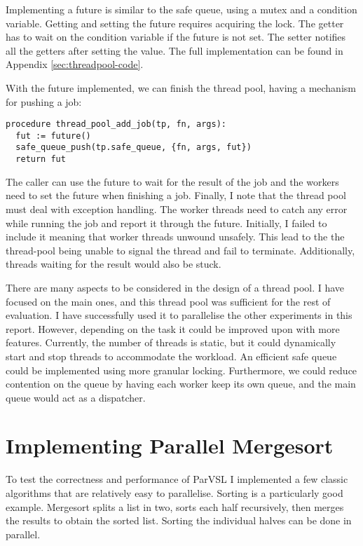 Implementing a future is similar to the safe queue, using a mutex and a condition variable.
Getting and setting the future requires acquiring the lock. The getter has to wait on the condition
variable if the future is not set. The setter notifies all the getters after setting the value.
The full implementation can be found in Appendix \ref{sec:threadpool-code}.

With the future implemented, we can finish the thread pool, having a mechanism for pushing a job:

\begin{verbatim}
procedure thread_pool_add_job(tp, fn, args):
  fut := future()
  safe_queue_push(tp.safe_queue, {fn, args, fut})
  return fut
\end{verbatim}

The caller can use the future to wait for the result of the job and the workers need to set the future
when finishing a job. Finally, I note that the thread pool must deal with exception handling. The worker threads
need to catch any error while running the job and report it through the future. Initially, I failed to include
it meaning that worker threads unwound unsafely. This lead to the the thread-pool being unable to signal the
thread and fail to terminate. Additionally, threads waiting for the result would also be stuck.

There are many aspects to be considered in the design of a thread pool. I have focused on the main ones, and
this thread pool was sufficient for the rest of evaluation. I have successfully used it to parallelise the
other experiments in this report. However, depending on the task it could be improved upon with more features.
Currently, the number of threads is static, but it could dynamically start and stop threads to accommodate
the workload. An efficient safe queue could be implemented using more granular locking. Furthermore, we could
reduce contention on the queue by having each worker keep its own queue, and the main queue would act as a
dispatcher.

\section{Implementing Parallel Mergesort}

To test the correctness and performance of ParVSL I implemented a few classic algorithms that are relatively
easy to parallelise. Sorting is a particularly good example. Mergesort splits a list in two, sorts each half
recursively, then merges the results to obtain the sorted list. Sorting the individual halves can be done
in parallel.

